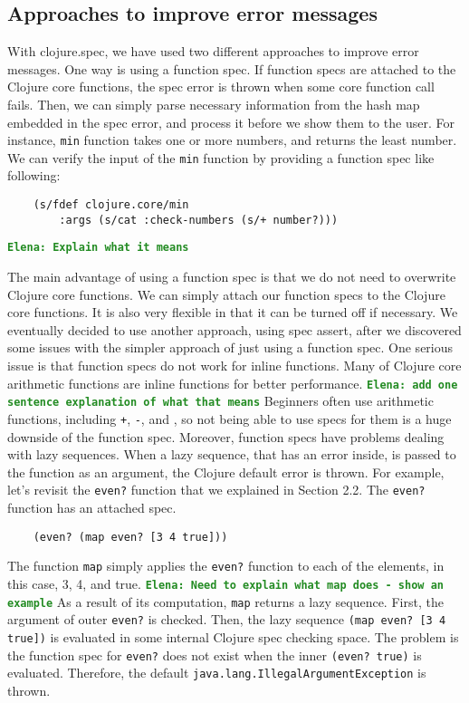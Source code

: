 \documentclass[12pt]{article}
\newcommand{\comment}[1]{{\bf \tt  {#1}}}
\newcommand{\emcomment}[1]{\textcolor{ForestGreen}{\comment{Elena: {#1}}}}
\begin{document}
	\subsection{Approaches to improve error messages}\label{sec:approach}
	With clojure.spec, we have used two different approaches to improve error messages. One way is using a function spec. 
	If function specs are attached to the Clojure core functions, the spec error is thrown when some core function 
	call fails. Then, we can simply parse necessary information from the hash map embedded in the spec error, and 
	process it before we show them to the user. For instance, {\tt min} function 
	takes one or more numbers, and returns the least number. We can verify the input of the {\tt min} function by providing a 
	function spec like following:

	\begin{verbatim}
	(s/fdef clojure.core/min
		:args (s/cat :check-numbers (s/+ number?)))
	\end{verbatim}
	\emcomment{Explain what it means}

	The main advantage of using a function spec is that we do not need to overwrite Clojure core functions. We can simply attach our 
	function specs to the Clojure core functions. It is also very flexible in that it can be turned off if necessary. 
	We eventually decided to use another approach, using spec assert, after we 
	discovered some issues with the simpler approach of just using a function spec. 
	One serious issue is that function specs do not work for inline functions.
	Many of Clojure core arithmetic functions are inline functions for better performance.
	\emcomment{add one sentence explanation of what that means}
	Beginners often use arithmetic functions, including {\tt +}, {\tt -}, and {\tt *}, 
	so not being able to use specs for them is a huge downside of the function spec. 
	Moreover, function specs have problems dealing with lazy sequences. When a lazy sequence, 
	that has an error inside, is passed to the function as an argument, the Clojure default error is thrown. 
	For example, let's revisit the {\tt even?} function that we explained in Section 2.2. 
	The {\tt even?} function has an attached spec.
	\begin{verbatim}
	(even? (map even? [3 4 true]))
	\end{verbatim}
	The function {\tt map} simply applies the {\tt even?} function to each of the elements, in this case, 3, 4, and true.
	\emcomment{Need to explain what map does - show an example}
	As a result of its computation, {\tt map} returns a lazy sequence.
	First, the argument of outer {\tt even?} is checked. Then, the lazy sequence {\tt (map even? [3 4 true])} is
	evaluated in some internal Clojure spec checking space. The problem is the function spec for {\tt even?} does not exist
	when the inner {\tt (even? true)} is evaluated. Therefore, the default {\tt java.lang.IllegalArgumentException} is thrown.
\end{document}
